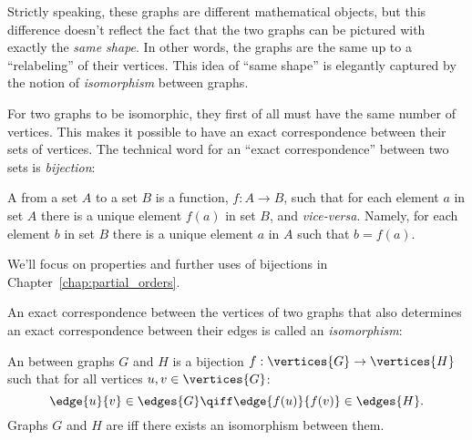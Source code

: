  Strictly speaking, these graphs are different mathematical
objects, but this difference doesn't reflect the fact that the two graphs
can be pictured with exactly the \emph{same shape}.  In other words, the
graphs are the same up to a ``relabeling'' of their vertices.  This idea
of ``same shape'' is elegantly captured by the notion of
\emph{isomorphism} between graphs.

For two graphs to be isomorphic, they first of all must have the same
number of vertices.  This makes it possible to have an exact
correspondence between their sets of vertices.  The technical word for an
``exact correspondence'' between two sets is \emph{bijection}:

\begin{definition}
A  from a set $A$ to a set $B$ is a function, $f:A\to B$,
such that for each element $a$ in set $A$ there is a unique
element $f(a)$ in set $B$, and \emph{vice-versa}.  Namely, for each
element $b$ in set $B$ there is a unique element $a$ in
$A$ such that $b = f(a)$.
\end{definition}
We'll focus on properties and further uses of bijections in
Chapter~\ref{chap:partial_orders}.

An exact correspondence between the vertices of two graphs that also
determines an exact correspondence between their edges is called an
\emph{isomorphism}:
\begin{definition}\label{simple-isomorphism}
An  between graphs $G$ and $H$ is a
  bijection $f:\vertices{G} \to
  \vertices{H}$ such that for all vertices $u, v \in
  \vertices{G}$:
\[
\edge{u}{v} \in \edges{G} \qiff \edge{f(u)}{f(v)} \in \edges{H}.
\]
Graphs $G$ and $H$ are  iff there exists an
isomorphism between them.
\end{definition}

